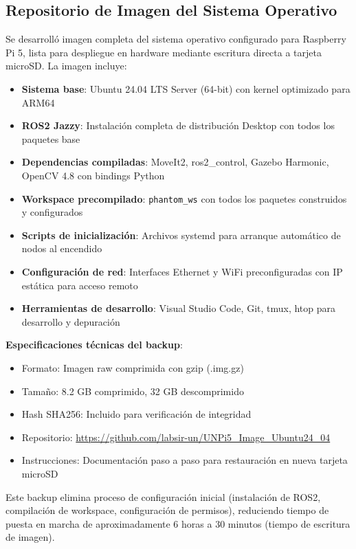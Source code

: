 \subsection{Repositorio de Imagen del Sistema Operativo}

Se desarrolló imagen completa del sistema operativo configurado para Raspberry Pi 5, lista para despliegue en hardware mediante escritura directa a tarjeta microSD. La imagen incluye:

\begin{itemize}
    \item \textbf{Sistema base}: Ubuntu 24.04 LTS Server (64-bit) con kernel optimizado para ARM64
    \item \textbf{ROS2 Jazzy}: Instalación completa de distribución Desktop con todos los paquetes base
    \item \textbf{Dependencias compiladas}: MoveIt2, ros2\_control, Gazebo Harmonic, OpenCV 4.8 con bindings Python
    \item \textbf{Workspace precompilado}: \texttt{phantom\_ws} con todos los paquetes construidos y configurados
    \item \textbf{Scripts de inicialización}: Archivos systemd para arranque automático de nodos al encendido
    \item \textbf{Configuración de red}: Interfaces Ethernet y WiFi preconfiguradas con IP estática para acceso remoto
    \item \textbf{Herramientas de desarrollo}: Visual Studio Code, Git, tmux, htop para desarrollo y depuración
\end{itemize}

\textbf{Especificaciones técnicas del backup}:
\begin{itemize}
    \item Formato: Imagen raw comprimida con gzip (.img.gz)
    \item Tamaño: 8.2 GB comprimido, 32 GB descomprimido
    \item Hash SHA256: Incluido para verificación de integridad
    \item Repositorio: \url{https://github.com/labsir-un/UNPi5_Image_Ubuntu24_04}
    \item Instrucciones: Documentación paso a paso para restauración en nueva tarjeta microSD
\end{itemize}

Este backup elimina proceso de configuración inicial (instalación de ROS2, compilación de workspace, configuración de permisos), reduciendo tiempo de puesta en marcha de aproximadamente 6 horas a 30 minutos (tiempo de escritura de imagen).

